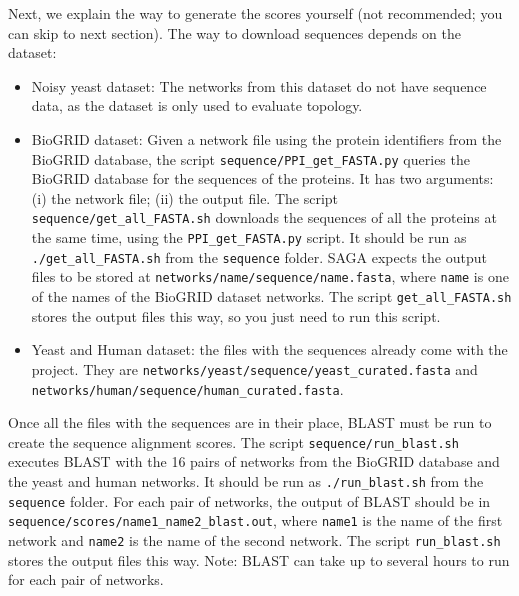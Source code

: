 \documentclass[]{article}
\begin{document}
Next, we explain the way to generate the scores yourself (not recommended; you can skip to next section). The way to download sequences depends on the dataset:
\begin{itemize}
\item Noisy yeast dataset: The networks from this dataset do not have sequence data, as the dataset is only used to evaluate topology.
\item BioGRID dataset: Given a network file using the protein identifiers from the BioGRID database, the script \texttt{sequence/PPI\_get\_FASTA.py} queries the BioGRID database for the sequences of the proteins. It has two arguments: (i) the network file; (ii) the output file. The script \texttt{sequence/get\_all\_FASTA.sh} downloads the sequences of all the proteins at the same time, using the \texttt{PPI\_get\_FASTA.py} script. It should be run as \texttt{./get\_all\_FASTA.sh} from the \texttt{sequence} folder. SAGA expects the output files to be stored at \texttt{networks/name/sequence/name.fasta}, where \texttt{name} is one of the names of the BioGRID dataset networks. The script \texttt{get\_all\_FASTA.sh} stores the output files this way, so you just need to run this script.
\item Yeast and Human dataset: the files with the sequences already come with the project. They are \texttt{networks/yeast/sequence/yeast\_curated.fasta} and\\ \texttt{networks/human/sequence/human\_curated.fasta}.
\end{itemize}

Once all the files with the sequences are in their place, BLAST must be run to create the sequence alignment scores. The script \texttt{sequence/run\_blast.sh} executes BLAST with the 16 pairs of networks from the BioGRID database and the yeast and human networks. It should be run as \texttt{./run\_blast.sh} from the \texttt{sequence} folder. For each pair of networks, the output of BLAST should be in \texttt{sequence/scores/name1\_name2\_blast.out}, where \texttt{name1} is the name of the first network and \texttt{name2} is the name of the second network. The script \texttt{run\_blast.sh} stores the output files this way. Note: BLAST can take up to several hours to run for each pair of networks.
\end{document}
